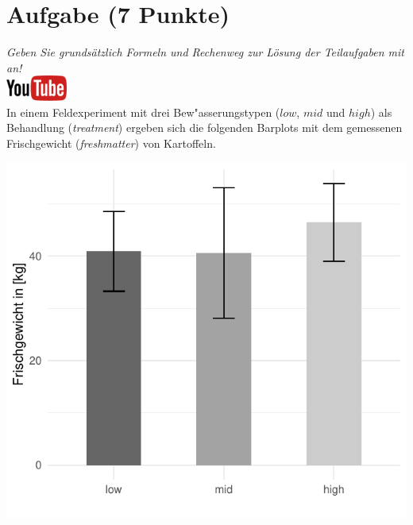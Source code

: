 \documentclass[a4paper, 9pt]{scrartcl}\usepackage[]{graphicx}\usepackage[]{xcolor}
\makeatletter
\def\maxwidth{ %
  \ifdim\Gin@nat@width>\linewidth
    \linewidth
  \else
    \Gin@nat@width
  \fi
}
\makeatother
\begin{document}
 
\clearpage

\section{Aufgabe \hfill (7 Punkte)}

\textit{Geben Sie grunds{\"a}tzlich Formeln und Rechenweg zur L{\"o}sung der
  Teilaufgaben mit an!} \\[1Ex]

\hfill\href{https://youtu.be/t0WYa_LVc5o}{\includegraphics[width = 2cm]{img/youtube}}\\[1Ex]



In einem Feldexperiment mit drei Bew{"a}sserungstypen ($low$, $mid$ und $high$) als Behandlung
(\textit{treatment}) ergeben sich die folgenden Barplots mit dem
gemessenen Frischgewicht (\textit{freshmatter}) von Kartoffeln.




{\centering \includegraphics[width=\maxwidth]{img/barplot-02-1} 

}
\end{document}
